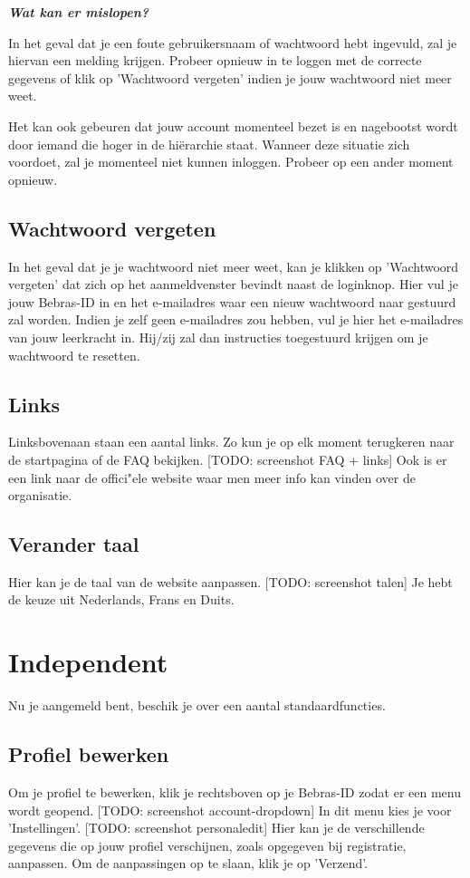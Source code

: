 \documentclass[]{article}
\begin{document}
\textbf{\textit{Wat kan er mislopen?}}

In het geval dat je een foute gebruikersnaam of wachtwoord hebt ingevuld, zal je hiervan een melding krijgen. Probeer opnieuw in te loggen met de correcte gegevens of klik op 'Wachtwoord vergeten' indien je jouw wachtwoord niet meer weet.

Het kan ook gebeuren dat jouw account momenteel bezet is en nagebootst wordt door iemand die hoger in de hiërarchie staat. Wanneer deze situatie zich voordoet, zal je momenteel niet kunnen inloggen. Probeer op een ander moment opnieuw.

\subsection{Wachtwoord vergeten}
In het geval dat je je wachtwoord niet meer weet, kan je klikken op 'Wachtwoord vergeten' dat zich op het aanmeldvenster bevindt naast de loginknop. Hier vul je jouw Bebras-ID in en het e-mailadres waar een nieuw wachtwoord naar gestuurd zal worden. Indien je zelf geen e-mailadres zou hebben, vul je hier het e-mailadres van jouw leerkracht in. Hij/zij zal dan instructies toegestuurd krijgen om je wachtwoord te resetten.

\subsection{Links}
Linksbovenaan staan een aantal links. Zo kun je op elk moment terugkeren naar de startpagina of de FAQ bekijken. [TODO: screenshot FAQ + links] Ook is er een link naar de offici"ele website waar men meer info kan vinden over de organisatie.

\subsection{Verander taal}
Hier kan je de taal van de website aanpassen. [TODO: screenshot talen] Je hebt de keuze uit Nederlands, Frans en Duits.

\section{Independent}

Nu je aangemeld bent, beschik je over een aantal standaardfuncties.

\subsection{Profiel bewerken}
Om je profiel te bewerken, klik je rechtsboven op je Bebras-ID zodat er een menu wordt geopend. [TODO: screenshot account-dropdown] In dit menu kies je voor 'Instellingen'. [TODO: screenshot personaledit] Hier kan je de verschillende gegevens die op jouw profiel verschijnen, zoals opgegeven bij registratie, aanpassen. Om de aanpassingen op te slaan, klik je op 'Verzend'.
\end{document}
